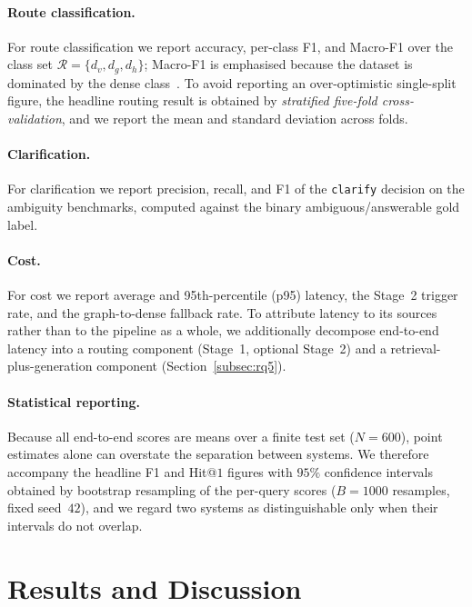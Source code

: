 \documentclass[pdflatex,sn-mathphys-num]{sn-jnl}
\begin{document}
\paragraph{Route classification.}
For route classification we report accuracy, per-class F1, and Macro-F1 over
the class set $\mathcal{R}=\{d_v,d_g,d_h\}$; Macro-F1 is emphasised because the
dataset is dominated by the dense class~\cite{powers2011evaluation}. To avoid
reporting an over-optimistic single-split figure, the headline routing result
is obtained by \emph{stratified five-fold cross-validation}, and we report the
mean and standard deviation across folds.

\paragraph{Clarification.}
For clarification we report precision, recall, and F1 of the \texttt{clarify}
decision on the ambiguity benchmarks, computed against the binary
ambiguous/answerable gold label.

\paragraph{Cost.}
For cost we report average and 95th-percentile (p95) latency, the Stage~2
trigger rate, and the graph-to-dense fallback rate. To attribute latency to its
sources rather than to the pipeline as a whole, we additionally decompose
end-to-end latency into a routing component (Stage~1, optional Stage~2) and a
retrieval-plus-generation component (Section~\ref{subsec:rq5}).

\paragraph{Statistical reporting.}
Because all end-to-end scores are means over a finite test set ($N=600$),
point estimates alone can overstate the separation between systems. We
therefore accompany the headline F1 and Hit@$1$ figures with $95\%$
confidence intervals obtained by bootstrap resampling of the per-query scores
($B=1000$ resamples, fixed seed~$42$), and we regard two systems as
distinguishable only when their intervals do not overlap.

\section{Results and Discussion}\label{sec:results}
\end{document}
